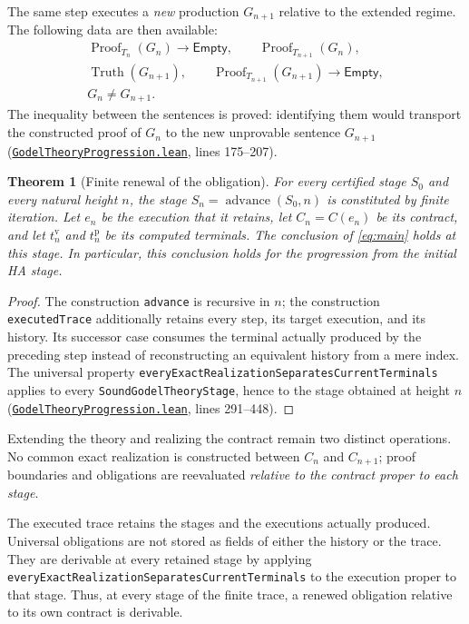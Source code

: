 \documentclass[11pt,a4paper]{article}
\newcommand{\Truth}{\operatorname{Truth}}
\newcommand{\Proof}{\operatorname{Proof}}
\newcommand{\Empty}{\mathsf{Empty}}
\newcommand{\code}[1]{\nolinkurl{#1}}
\newcommand{\SourceAt}[3]{\href{https://github.com/JohnDoe-collab-stack/relational-perimeter/blob/1e5aeda745559d62a3819bb3213da7fce3c31ad1/#1\#L#2}{\nolinkurl{#3}}}
\newtheorem{theorem}{Theorem}[section]
\theoremstyle{remark}
\begin{document}
The same step executes a \emph{new} production $G_{n+1}$ relative to the
extended regime. The following data are then available:
\[
\begin{gathered}
\Proof_{T_n}(G_n)\to\Empty,
\qquad \Proof_{T_{n+1}}(G_n),\\
\Truth(G_{n+1}),\qquad
\Proof_{T_{n+1}}(G_{n+1})\to\Empty,\\
G_n\neq G_{n+1}.
\end{gathered}
\]
The inequality between the sentences is proved: identifying them would
transport the constructed proof of $G_n$ to the new unprovable sentence
$G_{n+1}$
(\SourceAt{RelationalPerimeter/Instances/HeytingArithmetic/GodelTheoryProgression.lean}{175-L207}{GodelTheoryProgression.lean},
lines 175--207).

\begin{theorem}[Finite renewal of the obligation]\label{thm:finite}
For every certified stage $S_0$ and every natural height $n$, the stage
$S_n=\operatorname{advance}(S_0,n)$ is constituted by finite iteration.
Let $e_n$ be the execution that it retains, let $C_n=C(e_n)$ be its
contract, and let $t_n^{\mathrm v}$ and $t_n^{\mathrm p}$ be its computed
terminals. The conclusion of \eqref{eq:main} holds at this stage. In
particular, this conclusion holds for the progression from the initial HA
stage.
\end{theorem}
\begin{proof}
The construction \code{advance} is recursive in $n$; the construction
\code{executedTrace} additionally retains every step, its target execution,
and its history. Its successor case consumes the terminal actually produced
by the preceding step instead of reconstructing an equivalent history from
a mere index. The universal property
\code{everyExactRealizationSeparatesCurrentTerminals} applies to every
\code{SoundGodelTheoryStage}, hence to the stage obtained at height $n$
(\SourceAt{RelationalPerimeter/Instances/HeytingArithmetic/GodelTheoryProgression.lean}{291-L448}{GodelTheoryProgression.lean},
lines 291--448).
\end{proof}

Extending the theory and realizing the contract remain two distinct
operations. No common exact realization is constructed between $C_n$ and
$C_{n+1}$; proof boundaries and obligations are reevaluated \emph{relative
to the contract proper to each stage}.

The executed trace retains the stages and the executions actually produced.
Universal obligations are not stored as fields of either the history or the
trace. They are derivable at every retained stage by applying
\code{everyExactRealizationSeparatesCurrentTerminals} to the execution proper
to that stage. Thus, at every stage of the finite trace, a renewed obligation
relative to its own contract is derivable.
\end{document}
